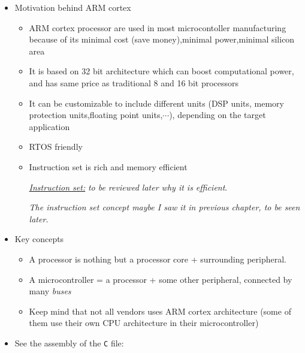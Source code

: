 \begin{itemize}

\item Motivation behind ARM cortex

\begin{itemize}
    
    \item ARM cortex processor are used in most microcontoller manufacturing because of its minimal cost (save money),minimal power,minimal silicon area


    \item It is based on 32 bit architecture which can boost computational power, and has same price as traditional 8 and 16 bit processors

    \item It can be customizable to include different units (DSP units, memory protection units,floating point units,$\cdots$), depending on the target application 

    \item RTOS friendly

    \item Instruction set is rich and memory efficient
    
     \underline{\textit{Instruction set:}}  \textit{to be reviewed later why it is efficient}.

    \textit{The instruction set concept maybe I saw it in previous chapter, to be seen later.}

     \end{itemize}   

\item Key concepts

    \begin{itemize}
        \item A processor is nothing but a processor core + surrounding peripheral.

        \item A microcontroller =  a processor + some other peripheral, connected by many \textit{buses} 

        \item Keep mind that not all vendors uses ARM cortex architecture (some of them use their own CPU architecture in their microcontroller)
        
    \end{itemize}



\item See the assembly of the \verb|C| file:


\end{itemize}

